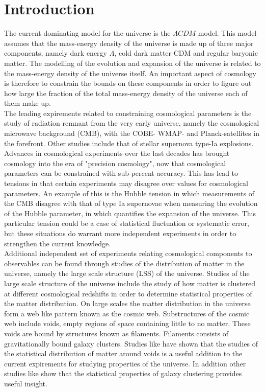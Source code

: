 \chapter{Introduction}
The current dominating model for the universe is the $\Lambda CDM$ model. This model assumes that the mass-energy density of the universe is made up of three major components, namely dark energy $\Lambda$, cold dark matter CDM and regular baryonic matter. The modelling of the evolution and expansion of the universe is related to the mass-energy density of the universe itself. An important aspect of cosmology is therefore to constrain the bounds on these components in order to figure out how large the fraction of the total mass-energy density of the universe each of them make up.\\\indent
The leading expirements related to constraining cosmological parameters is the study of radiation remnant from the very early universe, namely the cosmological microwave background (CMB)\cite{1965cmb}, with the COBE-\cite{Smoot_1999} WMAP-\cite{Wmap} and Planck-satellites\cite{planckvi} in the forefront. Other studies include that of stellar supernova type-Ia explosions\cite{Pantheon}. Advances in cosmological experiments over the last decades has brought cosmology into the era of "precision cosmology", now that cosmological parameters can be constrained with sub-percent accuracy. This has lead to tensions in that certain experiments may disagree over values for cosmological parameters. An example of this is the Hubble tension in which measurements of the CMB disagree with that of type Ia supernovae when measuring the evolution of the Hubble parameter, in which quantifies the expansion of the universe. This particular tension could be a case of statistical fluctuation or systematic error, but these situations do warrant more independent experiments in order to strengthen the current knowledge.\\\indent Additional independent set of experiments relating cosmological components to observables can be found through studies of the distribution of matter in the universe, namely the large scale structure (LSS) of the universe. Studies of the large scale structure of the universe include the study of how matter is clustered at different cosmological redshifts in order to determine statistical properties of the matter distribution. On large scales the matter distribution in the universe form a web like pattern known as the cosmic web\cite{bondweb}. Substructures of the cosmic web include voids, empty regions of space containing little to no matter. These voids are bound by structures known as filaments. Filaments consists of gravitationally bound galaxy clusters. Studies like \cite{BeyondBAO}\cite{Nadathur_2020} have shown that the studies of the statistical distribution of matter around voids is a useful addition to the current expirements for studying properties of the universe. In addition other studies like \cite{refId0} show that the statistical properties of galaxy clustering provides useful insight. \\\indent
